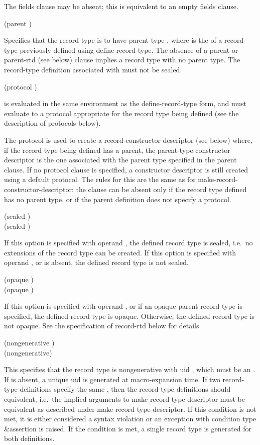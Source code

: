 \begin{entry}
The {\cf fields} clause may be absent; this is equivalent to an empty
{\cf fields} clause.

{\cf (parent )}
   
Specifies that the record type is to have parent type , where  is the  of a
record type previously defined using {\cf define-record-type}. The
absence of a {\cf parent} or {\cf parent-rtd} (see below) clause
implies a record type with no parent type.  The record-type definition
associated with  must not be sealed.

{\cf (protocol )}
   
 is evaluated in the same environment as the
define-record-type form, and must evaluate to a protocol appropriate
for the record type being defined (see the description of protocols
below).

The protocol is used to create a record-constructor descriptor (see
below) where, if the record type being defined has a parent, the
parent-type constructor descriptor is the one associated with the
parent type specified in the {\cf parent} clause.  If no {\cf
  protocol} clause is specified, a constructor descriptor is still
created using a default protocol. The rules for this are the same as
for {\cf make-record-constructor-descriptor}: the clause can be absent
only if the record type defined has no parent type, or if the parent
definition does not specify a protocol.

{\cf (sealed \schtrue)}\\
{\cf (sealed \schfalse)}
   
If this option is specified with operand \schtrue, the defined record
type is sealed, i.e.\ no extensions of the record type can be created.
If this option is specified with operand \schfalse, or is absent, the
defined record type is not sealed.

{\cf (opaque \schtrue)}\\
{\cf (opaque \schfalse)}
   
If this option is specified with operand \schtrue, or if an opaque
parent record type is specified, the defined record type is opaque.
Otherwise, the defined record type is not opaque.  See the
specification of {\cf record-rtd} below for details.
   
{\cf (nongenerative )}\\
{\cf (nongenerative)}
   
This specifies that the record type is nongenerative with uid
, which must be an .
If  is absent, a unique uid is generated at macro-expansion time.
If two record-type definitions specify the same , then
the record-type definitions should equivalent, i.e.\
the implied arguments to {\cf make-record-type-descriptor}
must be equivalent as described under {\cf make-record-type-descriptor}.
If this condition is not met, it is either considered a syntax violation or
an exception with condition type {\cf\&assertion} is raised.
If the condition is met, a single record type is generated for both
definitions.


\end{entry}

